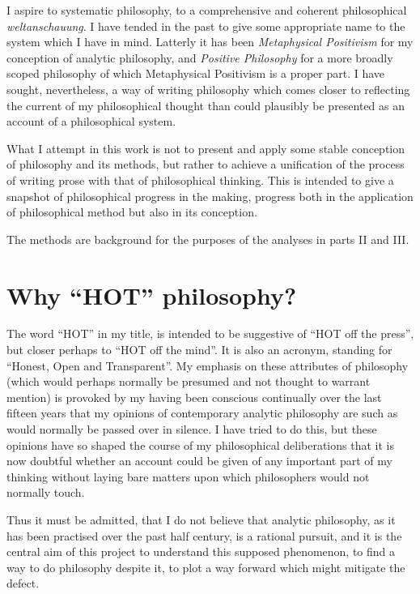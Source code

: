 I aspire to systematic philosophy, to a comprehensive and coherent philosophical \emph{weltanschauung}.
I have tended in the past to give some appropriate name to the system which I have in mind.
Latterly it has been {\it Metaphysical Positivism} for my conception of analytic philosophy, and {\it Positive Philosophy} for a more broadly scoped philosophy of which Metaphysical Positivism is a proper part.
I have sought, nevertheless, a way of writing philosophy which comes closer to reflecting the current of my philosophical thought than could plausibly be presented as an account of a philosophical system.

What I attempt in this work is not to present and apply some stable conception of philosophy and its methods, but rather to achieve a unification of the process of writing prose with that of philosophical thinking.
This is intended to give a snapshot of philosophical progress in the making, progress both in the application of philosophical method but also in its conception.

The methods are background for the purposes of the analyses in parts II and III.

\section{Why ``HOT'' philosophy?}

The word ``HOT'' in my title, is intended to be suggestive of ``HOT off the press'', but closer perhaps to ``HOT off the mind''.
It is also an acronym, standing for ``Honest, Open and Transparent''.
My emphasis on these attributes of philosophy (which would perhaps normally be presumed and not thought to warrant mention) is provoked by my having been conscious continually over the last fifteen years that my opinions of contemporary analytic philosophy are such as would normally be passed over in silence.
I have tried to do this, but these opinions have so shaped the course of my philosophical deliberations that it is now doubtful whether an account could be given of any important part of my thinking without laying bare matters upon which philosophers would not normally touch.

Thus it must be admitted, that I do not believe that analytic philosophy, as it has been practised over the past half century, is a rational pursuit, and it is the central aim of this project to understand this supposed phenomenon, to find a way to do philosophy despite it, to plot a way forward which might mitigate the defect.

